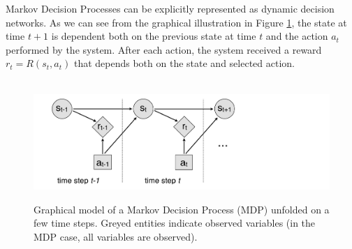 Markov Decision Processes can be explicitly represented as dynamic decision networks.  As we can see from the graphical illustration in Figure \ref{fig:mdp}, the state at time $t+1$ is dependent both on the previous state at time $t$ and the action $a_t$ performed by the system. After each action, the system received a reward $r_t = R(s_t, a_t)$ that depends both on the state and selected action. 

\begin{figure}[h]
$\phantom{d}$\hspace{20mm}
\includegraphics[scale=0.25]{imgs/MDP.pdf}
\caption{Graphical model of a Markov Decision Process (MDP) unfolded on a few time steps.  Greyed entities indicate observed variables (in the MDP case, all variables are observed).}
\label{fig:mdp}
\end{figure}

